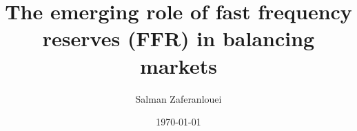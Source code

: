\title{The emerging role of fast frequency reserves (FFR) in balancing markets}



\author{Salman Zaferanlouei}
\date{\today}

